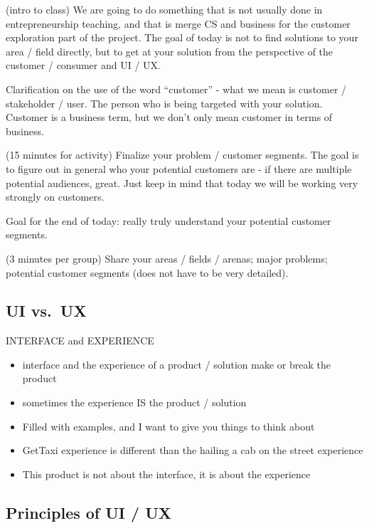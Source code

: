 (intro to class) We are going to do something that is not usually done
in entrepreneurship teaching, and that is merge CS and business for the
customer exploration part of the project. The goal of today is not to
find solutions to your area / field directly, but to get at your
solution from the perspective of the customer / consumer and UI / UX.

Clarification on the use of the word ``customer'' - what we mean is
customer / stakeholder / user. The person who is being targeted with
your solution. Customer is a business term, but we don't only mean
customer in terms of business.

(15 minutes for activity) Finalize your problem / customer segments. The
goal is to figure out in general who your potential customers are - if
there are multiple potential audiences, great. Just keep in mind that
today we will be working very strongly on customers.

Goal for the end of today: really truly understand your potential
customer segments.

(3 minutes per group) Share your areas / fields / arenas; major
problems; potential customer segments (does not have to be very
detailed).

\subsection{UI vs.~UX}

INTERFACE and EXPERIENCE

\begin{itemize}
\item
  interface and the experience of a product / solution make or break the
  product
\item
  sometimes the experience IS the product / solution
\item
  Filled with examples, and I want to give you things to think about
\end{itemize}
\begin{itemize}
\item
  GetTaxi experience is different than the hailing a cab on the street
  experience
\item
  This product is not about the interface, it is about the experience
\end{itemize}
\subsection{Principles of UI / UX}

